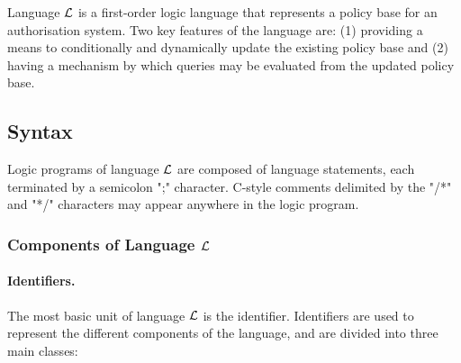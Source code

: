 \documentclass[global,twocolumn,final]{svjour}
\begin{document}
    Language $\cal{L}$ is a first-order logic language that represents a policy
    base for an authorisation system. Two key features of the language are: (1)
    providing a means to conditionally and dynamically update the existing
    policy base and (2) having a mechanism by which queries may be evaluated
    from the updated policy base.

    \subsection{Syntax}
      \label{subsec-syntax}

      Logic programs of language ${\cal L}$ are composed of language
      statements, each terminated by a semicolon ";" character. C-style
      comments delimited by the "/*" and "*/" characters may appear anywhere in
      the logic program.

      \subsubsection{Components of Language $\cal{L}$}

        \paragraph{Identifiers.}
          The most basic unit of language $\cal{L}$ is the identifier.
          Identifiers are used to represent the different components of the
          language, and are divided into three main classes:
\end{document}
